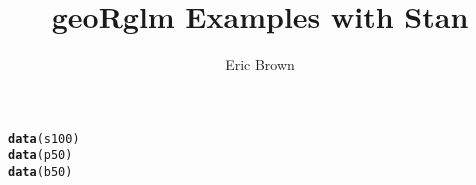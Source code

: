 \documentclass{article}\usepackage[]{graphicx}\usepackage[]{color}
\makeatletter
\newcommand{\hlstd}[1]{\textcolor[rgb]{0.345,0.345,0.345}{#1}}%
\newcommand{\hlkwd}[1]{\textcolor[rgb]{0.737,0.353,0.396}{\textbf{#1}}}%
\newenvironment{kframe}{%
 \def\at@end@of@kframe{}%
 \ifinner\ifhmode%
  \def\at@end@of@kframe{\end{minipage}}%
  \begin{minipage}{\columnwidth}%
 \fi\fi%
 \def\FrameCommand##1{\hskip\@totalleftmargin \hskip-\fboxsep
 \colorbox{shadecolor}{##1}\hskip-\fboxsep
     \hskip-\linewidth \hskip-\@totalleftmargin \hskip\columnwidth}%
 \MakeFramed {\advance\hsize-\width
   \@totalleftmargin\z@ \linewidth\hsize
   \@setminipage}}%
 {\par\unskip\endMakeFramed%
 \at@end@of@kframe}
\newenvironment{knitrout}{}{} %
\makeatother
\begin{document}
\title{geoRglm Examples with Stan}
\author{Eric Brown}
\maketitle







\begin{knitrout}
\color{fgcolor}\begin{kframe}
\begin{alltt}
\hlkwd{data}\hlstd{(s100)}
\hlkwd{data}\hlstd{(p50)}
\hlkwd{data}\hlstd{(b50)}
\end{alltt}
\end{kframe}
\end{knitrout}
\end{document}
